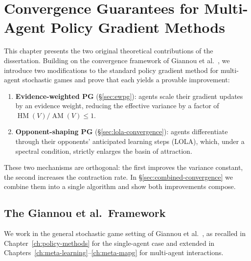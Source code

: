 \chapter{Convergence Guarantees for Multi-Agent Policy Gradient Methods}
\label{ch:convergence}

This chapter presents the two original theoretical contributions of the dissertation. Building on the convergence framework of Giannou et al.~\cite{giannou2022}, we introduce two modifications to the standard policy gradient method for multi-agent stochastic games and prove that each yields a provable improvement:
\begin{enumerate}
    \item \textbf{Evidence-weighted PG} (\S\ref{sec:ewpg}): agents scale their gradient updates by an evidence weight, reducing the effective variance by a factor of $\operatorname{HM}(V)/\operatorname{AM}(V) \leq 1$.
    \item \textbf{Opponent-shaping PG} (\S\ref{sec:lola-convergence}): agents differentiate through their opponents' anticipated learning steps (LOLA), which, under a spectral condition, strictly enlarges the basin of attraction.
\end{enumerate}
These two mechanisms are orthogonal: the first improves the variance constant, the second increases the contraction rate. In \S\ref{sec:combined-convergence} we combine them into a single algorithm and show both improvements compose.



\section{The Giannou et al.\ Framework}
\label{sec:giannou-recap}

We work in the general stochastic game setting of Giannou et al.~\cite{giannou2022}, as recalled in Chapter~\ref{ch:policy-methods} for the single-agent case and extended in Chapters~\ref{ch:meta-learning}--\ref{ch:meta-mapg} for multi-agent interactions.

